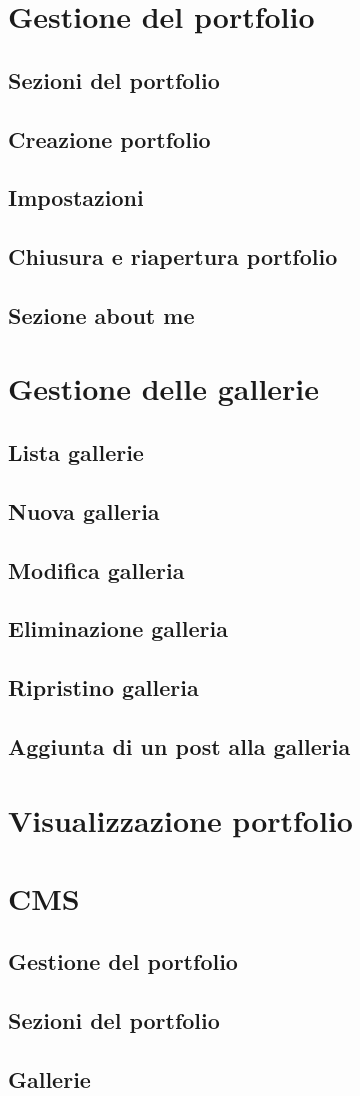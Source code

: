 
\section{Gestione del portfolio}
\subsection{Sezioni del portfolio}
\subsection{Creazione portfolio}
\subsection{Impostazioni}
\subsection{Chiusura e riapertura portfolio}
\subsection{Sezione about me}

\section{Gestione delle gallerie}
\subsection{Lista gallerie}
\subsection{Nuova galleria}
\subsection{Modifica galleria}
\subsection{Eliminazione galleria}
\subsection{Ripristino galleria}
\subsection{Aggiunta di un post alla galleria}


\section{Visualizzazione portfolio}

\section{CMS}
\subsection{Gestione del portfolio}
\subsection{Sezioni del portfolio}
\subsection{Gallerie}